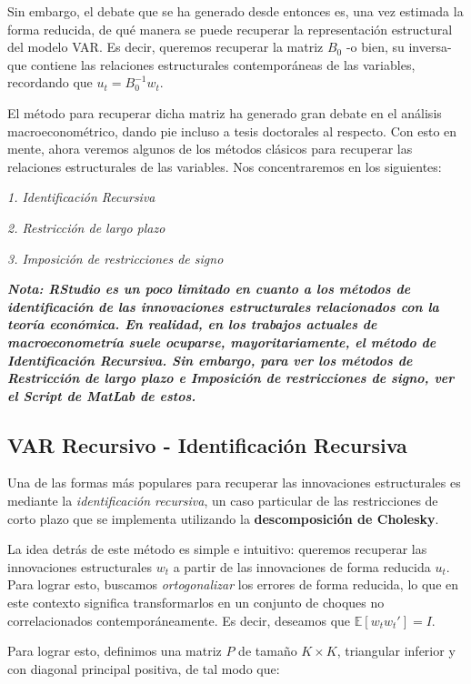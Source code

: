 \documentclass[
]{book}
\begin{document}
Sin embargo, el debate que se ha generado desde entonces es, una vez estimada la forma reducida, de qué manera se puede recuperar la representación estructural del modelo VAR. Es decir, queremos recuperar la matriz \(B_0\) -o bien, su inversa- que contiene las relaciones estructurales contemporáneas de las variables, recordando que \(u_t = B_0^{-1}w_t\).

El método para recuperar dicha matriz ha generado gran debate en el análisis macroeconométrico, dando pie incluso a tesis doctorales al respecto. Con esto en mente, ahora veremos algunos de los métodos clásicos para recuperar las relaciones estructurales de las variables. Nos concentraremos en los siguientes:

\emph{1. Identificación Recursiva}

\emph{2. Restricción de largo plazo}

\emph{3. Imposición de restricciones de signo}

\textbf{\emph{Nota: RStudio es un poco limitado en cuanto a los métodos de identificación de las innovaciones estructurales relacionados con la teoría económica. En realidad, en los trabajos actuales de macroeconometría suele ocuparse, mayoritariamente, el método de Identificación Recursiva. Sin embargo, para ver los métodos de Restricción de largo plazo e Imposición de restricciones de signo, ver el Script de MatLab de estos.}}

\hypertarget{var-recursivo---identificaciuxf3n-recursiva}{%
\subsection{VAR Recursivo - Identificación Recursiva}\label{var-recursivo---identificaciuxf3n-recursiva}}

Una de las formas más populares para recuperar las innovaciones estructurales es mediante la \emph{identificación recursiva}, un caso particular de las restricciones de corto plazo que se implementa utilizando la \textbf{descomposición de Cholesky}.

La idea detrás de este método es simple e intuitivo: queremos recuperar las innovaciones estructurales \(w_t\) a partir de las innovaciones de forma reducida \(u_t\). Para lograr esto, buscamos \emph{ortogonalizar} los errores de forma reducida, lo que en este contexto significa transformarlos en un conjunto de choques no correlacionados contemporáneamente. Es decir, deseamos que \(\mathbb{E}[w_t w_t'] = I\).

Para lograr esto, definimos una matriz \(P\) de tamaño \(K \times K\), triangular inferior y con diagonal principal positiva, de tal modo que:
\end{document}
